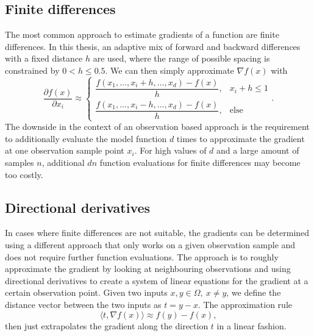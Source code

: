 \documentclass[
  a4paper,  %
  twoside,  %
  bibliography=totoc,
  headsepline,
  cleardoublepage=empty,
  parskip=half,
  draft=false
]{scrbook}
\begin{document}
\subsection{Finite differences}

The most common approach to estimate gradients of a function are finite differences.
In this thesis, an adaptive mix of forward and backward differences with a fixed distance $h$ are used, where the range of possible spacing is constrained by $0 < h \leq 0.5$.
We can then simply approximate $\nabla f(x)$ with
\begin{equation}
\frac{\partial f(x)}{\partial x_i} \approx
\begin{cases}
    \dfrac{f(x_1, \dots, x_i + h, \dots, x_d) - f(x)}{h}, & x_i + h \leq 1 \\[1.5em]
    \dfrac{f(x_1, \dots, x_i - h, \dots, x_d) - f(x)}{h}, & \text{else}
\end{cases}.
\end{equation}
%
The downside in the context of an observation based approach is the requirement to additionally evaluate the model function $d$ times to approximate the gradient at one observation sample point $x_i$.
For high values of $d$ and a large amount of samples $n$, additional $dn$ function evaluations for finite differences may become too costly.

\subsection{Directional derivatives}

In cases where finite differences are not suitable, the gradients can be determined using a different approach that only works on a given observation sample and does not require further function evaluations.
The approach is to roughly approximate the gradient by looking at neighbouring observations and using directional derivatives to create a system of linear equations for the gradient at a certain observation point.
Given two inputs $x, y \in \Omega, ~ x \neq y$, we define the distance vector between the two inputs as $t=y-x$.
The approximation rule
\begin{equation}
\langle t, \nabla f(x) \rangle \approx f(y) - f(x),
\end{equation}
then just extrapolates the gradient along the direction $t$ in a linear fashion.
\end{document}
